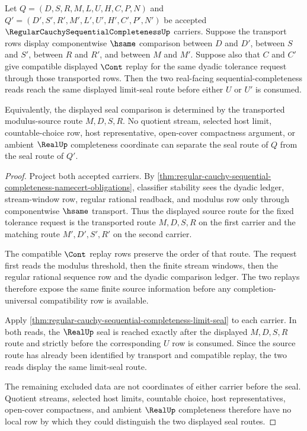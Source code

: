 \begin{theorem}
\label{thm:regular-cauchy-sequential-completeness-modulus-limit-determinacy}
Let $Q=(D,S,R,M,L,U,H,C,P,N)$ and $Q'=(D',S',R',M',L',U',H',C',P',N')$ be accepted $\RegularCauchySequentialCompletenessUp$ carriers. Suppose the transport rows display componentwise $\hsame$ comparison between $D$ and $D'$, between $S$ and $S'$, between $R$ and $R'$, and between $M$ and $M'$. Suppose also that $C$ and $C'$ give compatible displayed $\Cont$ replay for the same dyadic tolerance request through those transported rows. Then the two real-facing sequential-completeness reads reach the same displayed limit-seal route before either $U$ or $U'$ is consumed.

Equivalently, the displayed seal comparison is determined by the transported modulus-source route $M,D,S,R$. No quotient stream, selected host limit, countable-choice row, host representative, open-cover compactness argument, or ambient $\RealUp$ completeness coordinate can separate the seal route of $Q$ from the seal route of $Q'$.
\end{theorem}
\begin{proof}
Project both accepted carriers. By \autoref{thm:regular-cauchy-sequential-completeness-namecert-obligations}, classifier stability sees the dyadic ledger, stream-window row, regular rational readback, and modulus row only through componentwise $\hsame$ transport. Thus the displayed source route for the fixed tolerance request is the transported route $M,D,S,R$ on the first carrier and the matching route $M',D',S',R'$ on the second carrier.

The compatible $\Cont$ replay rows preserve the order of that route. The request first reads the modulus threshold, then the finite stream windows, then the regular rational sequence row and the dyadic comparison ledger. The two replays therefore expose the same finite source information before any completion-universal compatibility row is available.

Apply \autoref{thm:regular-cauchy-sequential-completeness-limit-seal} to each carrier. In both reads, the $\RealUp$ seal is reached exactly after the displayed $M,D,S,R$ route and strictly before the corresponding $U$ row is consumed. Since the source route has already been identified by transport and compatible replay, the two reads display the same limit-seal route.

The remaining excluded data are not coordinates of either carrier before the seal. Quotient streams, selected host limits, countable choice, host representatives, open-cover compactness, and ambient $\RealUp$ completeness therefore have no local row by which they could distinguish the two displayed seal routes.
\end{proof}

